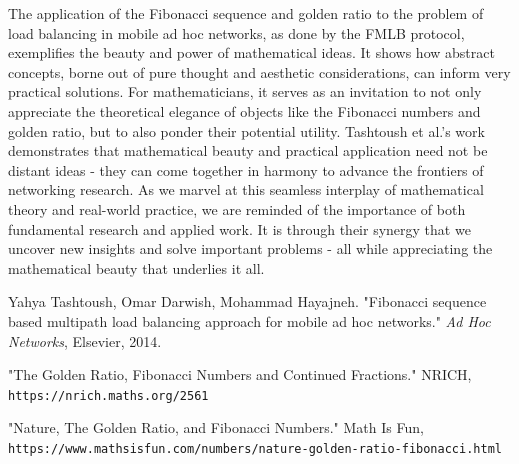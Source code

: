 \documentclass[12pt]{article}
\begin{document}
The application of the Fibonacci sequence and golden ratio to the problem of load balancing in mobile ad hoc networks, as done by the FMLB protocol, exemplifies the beauty and power of mathematical ideas. It shows how abstract concepts, borne out of pure thought and aesthetic considerations, can inform very practical solutions. For mathematicians, it serves as an invitation to not only appreciate the theoretical elegance of objects like the Fibonacci numbers and golden ratio, but to also ponder their potential utility. Tashtoush et al.'s work demonstrates that mathematical beauty and practical application need not be distant ideas - they can come together in harmony to advance the frontiers of networking research. As we marvel at this seamless interplay of mathematical theory and real-world practice, we are reminded of the importance of both fundamental research and applied work. It is through their synergy that we uncover new insights and solve important problems - all while appreciating the mathematical beauty that underlies it all.



\newpage
\begin{thebibliography}{9}

Yahya Tashtoush, Omar Darwish, Mohammad Hayajneh. 
"Fibonacci sequence based multipath load balancing approach for mobile ad hoc networks." 
\textit{Ad Hoc Networks}, Elsevier, 2014.

"The Golden Ratio, Fibonacci Numbers and Continued Fractions." NRICH, 
\texttt{https://nrich.maths.org/2561}

"Nature, The Golden Ratio, and Fibonacci Numbers." Math Is Fun,
\texttt{https://www.mathsisfun.com/numbers/nature-golden-ratio-fibonacci.html}

\end{thebibliography}
\end{document}
